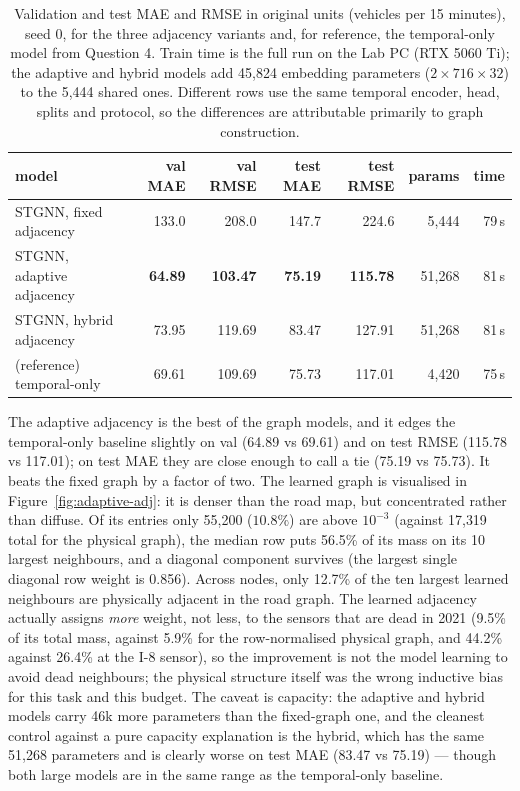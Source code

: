 \documentclass[11pt,letterpaper]{article}
\begin{document}
\begin{table}[htbp]
\centering
\footnotesize
\begin{tabular}{@{}lrrrrrr@{}}
\toprule
\textbf{model} & \textbf{val MAE} & \textbf{val RMSE} & \textbf{test MAE} & \textbf{test RMSE} & \textbf{params} & \textbf{time} \\
\midrule
STGNN, fixed adjacency & 133.0 & 208.0 & 147.7 & 224.6 & 5{,}444 & 79\,s \\
STGNN, adaptive adjacency & \textbf{64.89} & \textbf{103.47} & \textbf{75.19} & \textbf{115.78} & 51{,}268 & 81\,s \\
STGNN, hybrid adjacency & 73.95 & 119.69 & 83.47 & 127.91 & 51{,}268 & 81\,s \\
(reference) temporal-only & 69.61 & 109.69 & 75.73 & 117.01 & 4{,}420 & 75\,s \\
\bottomrule
\end{tabular}
\caption{Validation and test MAE and RMSE in original units (vehicles per 15 minutes),
seed 0, for the three adjacency variants and, for reference, the temporal-only model from
Question 4. Train time is the full run on the Lab PC (RTX 5060 Ti); the adaptive and hybrid
models add 45{,}824 embedding parameters ($2 \times 716 \times 32$) to the 5{,}444 shared
ones. Different rows use the same temporal encoder, head, splits and protocol, so the
differences are attributable primarily to graph construction.}
\label{tab:q5-results}
\end{table}

The adaptive adjacency is the best of the graph models, and it edges the temporal-only
baseline slightly on val (64.89 vs 69.61) and on test RMSE (115.78 vs 117.01); on test MAE
they are close enough to call a tie (75.19 vs 75.73). It beats the fixed graph by a factor
of two. The learned graph is visualised in
Figure~\ref{fig:adaptive-adj}: it is denser than the road map, but concentrated rather than diffuse. Of its entries only 55{,}200 ($10.8\%$) are above $10^{-3}$ (against 17{,}319
total for the physical graph), the median row puts 56.5\% of its mass on its 10 largest
neighbours, and a diagonal component survives (the largest single diagonal row weight is
0.856). Across nodes, only
12.7\% of the ten largest learned neighbours are physically adjacent in the road graph. The learned adjacency actually
assigns \emph{more} weight, not less, to the sensors that are dead in 2021 (9.5\% of its
total mass, against 5.9\% for the row-normalised physical graph, and 44.2\% against 26.4\%
at the I-8 sensor), so the improvement is not the model learning to avoid dead neighbours;
the physical structure itself was the wrong inductive bias for this task and this budget. The caveat is
capacity: the adaptive and hybrid models carry 46k more parameters than the fixed-graph one,
and the cleanest control against a pure capacity explanation is the hybrid, which has the
same 51{,}268 parameters and is clearly worse on test MAE (83.47 vs 75.19) — though both
large models are in the same range as the temporal-only baseline.
\end{document}
